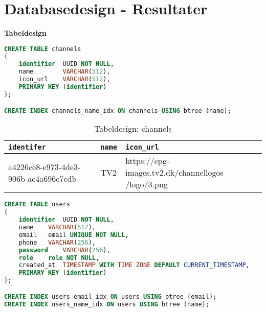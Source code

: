 \section{Databasedesign - Resultater}\label{database_design}

{\large\textbf{Tabeldesign}}


\begin{lstlisting}[language=sql, caption=channels.sql]
CREATE TABLE channels
(
    identifier  UUID NOT NULL,
    name        VARCHAR(512),
    icon_url    VARCHAR(512),
    PRIMARY KEY (identifier)
);

CREATE INDEX channels_name_idx ON channels USING btree (name);
\end{lstlisting}


\begin{table}[ht]
    \begin{tabularx}{\textwidth}{|>{\RaggedRight}X|>{\RaggedRight}X|>{\RaggedRight}X|}
        \hline
        \texttt{\textbf{identifer}} &  \texttt{\textbf{name}} & \texttt{\textbf{icon\_url}}\\
        \hline
        a4226ce8-e973-4de3-906b-ac4a696c7cdb & TV2 & https://epg-images.tv2.dk/channellogos /logo/3.png \\
        \hline
    \end{tabularx}
    \caption{Tabeldesign: channels}
    \label{tab:channel_table}
\end{table}




\begin{lstlisting}[language=sql, caption=users.sql]
CREATE TABLE users
(
    identifier  UUID NOT NULL,
    name	VARCHAR(512),
    email	email UNIQUE NOT NULL,
    phone	VARCHAR(256),
    password    VARCHAR(256),
    role	role NOT NULL,
    created_at  TIMESTAMP WITH TIME ZONE DEFAULT CURRENT_TIMESTAMP,
    PRIMARY KEY (identifier)
);

CREATE INDEX users_email_idx ON users USING btree (email);
CREATE INDEX users_name_idx ON users USING btree (name);
\end{lstlisting}


